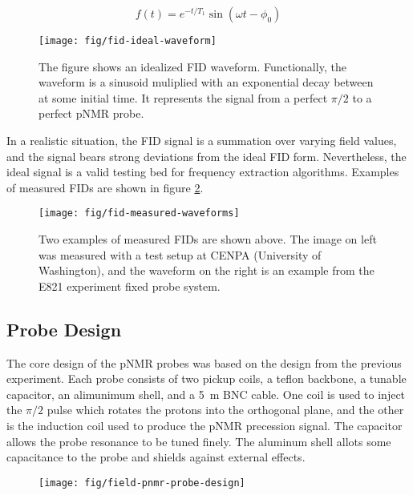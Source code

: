 \begin{equation}
f(t) = e^{-t/T_1} \sin(\omega t - \phi_0)
\label{eqn:ideal-fid}
\end{equation}

\begin{figure}
\label{fig:fid-ideal-waveform}
\centering
\texttt{[image: fig/fid-ideal-waveform]}
\caption{The figure shows an idealized FID waveform. Functionally, the waveform is a sinusoid muliplied with an exponential decay between at some initial time.  It represents the signal from a perfect $\pi/2$ to a perfect pNMR probe.}
\end{figure}

In a realistic situation, the FID signal is a summation over varying field values, and the signal bears strong deviations from the ideal FID form.  Nevertheless, the ideal signal is a valid testing bed for frequency extraction algorithms.  Examples of measured FIDs are shown in figure \ref{fig:fid-measured-waveforms}.

\begin{figure}
\label{fig:fid-measured-waveforms}
\texttt{[image: fig/fid-measured-waveforms]}
\caption{Two examples of measured FIDs are shown above. The image on left was measured with a test setup at CENPA (University of Washington), and the waveform on the right is an example from the E821 experiment fixed probe system.}
\end{figure}


\subsection{Probe Design}

The core design of the pNMR probes was based on the design from the previous experiment. Each probe consists of two pickup coils, a teflon backbone, a tunable capacitor, an alimunimum shell, and a \SI{5}{\meter} BNC cable.  One coil is used to inject the $\pi/2$ pulse which rotates the protons into the orthogonal plane, and the other is the induction coil used to produce the pNMR precession signal.  The capacitor allows the probe resonance to be tuned finely.  The aluminum shell allots some capacitance to the probe and shields against external effects.

\begin{figure}
\label{fig:field-pnmr-probe-design}
\texttt{[image: fig/field-pnmr-probe-design]}
\caption{}
\end{figure}

